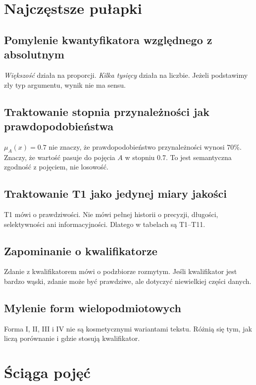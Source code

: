 \documentclass[11pt,a4paper]{article}
\begin{document}
\section{Najczęstsze pułapki}

\subsection{Pomylenie kwantyfikatora względnego z absolutnym}

\emph{Większość} działa na proporcji. \emph{Kilka tysięcy} działa na liczbie. Jeżeli podstawimy zły typ argumentu, wynik nie ma sensu.

\subsection{Traktowanie stopnia przynależności jak prawdopodobieństwa}

\(\mu_A(x)=0.7\) nie znaczy, że prawdopodobieństwo przynależności wynosi 70\%. Znaczy, że wartość pasuje do pojęcia \(A\) w stopniu 0.7. To jest semantyczna zgodność z pojęciem, nie losowość.

\subsection{Traktowanie T1 jako jedynej miary jakości}

T1 mówi o prawdziwości. Nie mówi pełnej historii o precyzji, długości, selektywności ani informacyjności. Dlatego w tabelach są T1--T11.

\subsection{Zapominanie o kwalifikatorze}

Zdanie z kwalifikatorem mówi o podzbiorze rozmytym. Jeśli kwalifikator jest bardzo wąski, zdanie może być prawdziwe, ale dotyczyć niewielkiej części danych.

\subsection{Mylenie form wielopodmiotowych}

Forma I, II, III i IV nie są kosmetycznymi wariantami tekstu. Różnią się tym, jak liczą porównanie i gdzie stosują kwalifikator.

\section{Ściąga pojęć}
\end{document}
